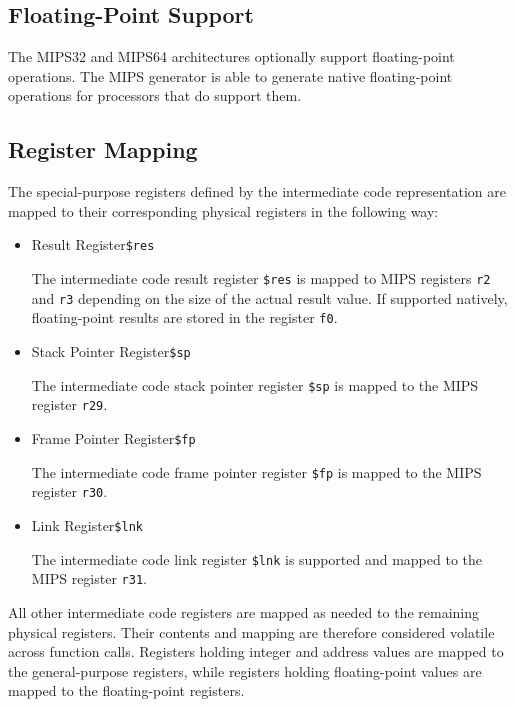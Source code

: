 \subsection{Floating-Point Support}

The MIPS32 and MIPS64 architectures optionally support floating-point operations.
The MIPS generator is able to generate native floating-point operations for processors that do support them.

\subsection{Register Mapping}

The special-purpose registers defined by the intermediate code representation are mapped to their corresponding physical registers in the following way:

\begin{itemize}

\item Result Register\alignright\texttt{\$res}\nopagebreak

The intermediate code result register \texttt{\$res} is mapped to MIPS registers \texttt{r2} and \texttt{r3} depending on the size of the actual result value.
If supported natively, floating-point results are stored in the register \texttt{f0}.

\item Stack Pointer Register\alignright\texttt{\$sp}\nopagebreak

The intermediate code stack pointer register \texttt{\$sp} is mapped to the MIPS register \texttt{r29}.

\item Frame Pointer Register\alignright\texttt{\$fp}\nopagebreak

The intermediate code frame pointer register \texttt{\$fp} is mapped to the MIPS register \texttt{r30}.

\item Link Register\alignright\texttt{\$lnk}\nopagebreak

The intermediate code link register \texttt{\$lnk} is supported and mapped to the MIPS register \texttt{r31}.

\end{itemize}

All other intermediate code registers are mapped as needed to the remaining physical registers.
Their contents and mapping are therefore considered volatile across function calls.
Registers holding integer and address values are mapped to the general-purpose registers,
while registers holding floating-point values are mapped to the floating-point registers.

